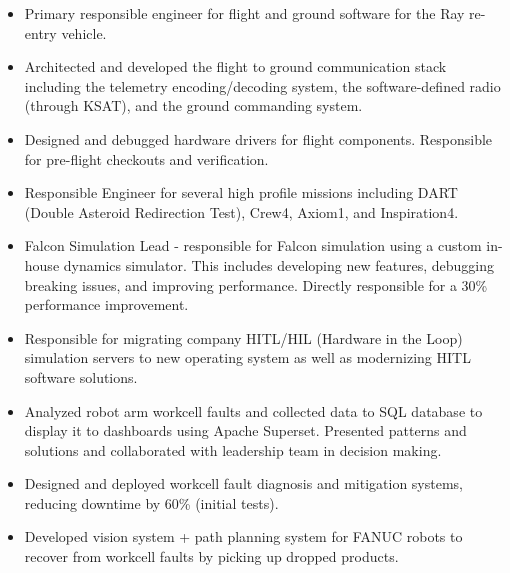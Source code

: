     \begin{itemize}
        \item Primary responsible engineer for flight and ground software for the Ray re-entry vehicle.
        \item Architected and developed the flight to ground communication stack including the telemetry encoding/decoding system, the software-defined radio (through KSAT), and the ground commanding system.
        \item Designed and debugged hardware drivers for flight components. Responsible for pre-flight checkouts and verification.
    \end{itemize}
\divider
{}
    \begin{itemize}
        \item Responsible Engineer for several high profile missions including DART (Double Asteroid Redirection Test), Crew4, Axiom1, and Inspiration4.
        \item Falcon Simulation Lead - responsible for Falcon simulation using a custom in-house dynamics simulator. This includes developing new features, debugging breaking issues, and improving performance. Directly responsible for a 30\% performance improvement.
        \item Responsible for migrating company HITL/HIL (Hardware in the Loop) simulation servers to new operating system as well as modernizing HITL software solutions.
    \end{itemize}
{}
    \begin{itemize}
        \item Analyzed robot arm workcell faults and collected data to SQL database to display it to dashboards using Apache Superset. Presented patterns and solutions and collaborated with leadership team in decision making.
        \item Designed and deployed workcell fault diagnosis and mitigation systems, reducing downtime by 60\% (initial tests).
        \item Developed vision system + path planning system for FANUC robots to recover from workcell faults by picking up dropped products.
    \end{itemize}
